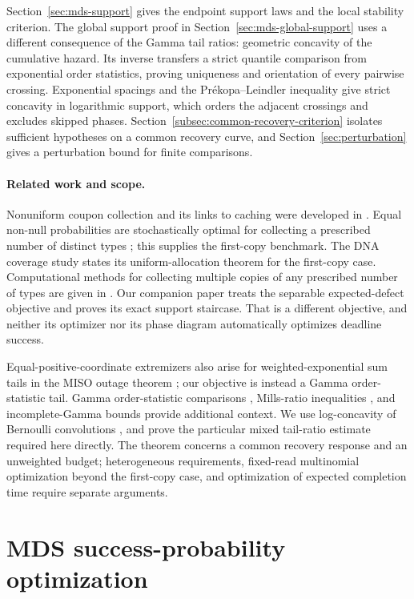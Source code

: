 \documentclass[11pt]{article}
\theoremstyle{definition}
\theoremstyle{remark}
\newcommand{\1}{\mathbf 1}
\begin{document}
Section~\ref{sec:mds-support} gives the endpoint support laws and the
local stability criterion. The global support proof in
Section~\ref{sec:mds-global-support} uses a different consequence of
the Gamma tail ratios: geometric concavity of the cumulative hazard.
Its inverse transfers a strict quantile comparison from exponential
order statistics, proving uniqueness and orientation of every
pairwise crossing. Exponential spacings and the Pr\'ekopa--Leindler
inequality give strict concavity in logarithmic support, which orders
the adjacent crossings and excludes skipped phases.
Section~\ref{subsec:common-recovery-criterion} isolates sufficient
hypotheses on a common recovery curve, and
Section~\ref{sec:perturbation} gives a perturbation bound for finite
comparisons.

\paragraph{Related work and scope.}
Nonuniform coupon collection and its links to caching were developed in \cite{FGT1992}. Equal non-null probabilities are stochastically optimal for collecting a prescribed number of distinct types \cite{Anceaume2015}; this supplies the first-copy benchmark. The DNA coverage study \cite{BarLevSabaryGabrysYaakobi2025} states its uniform-allocation theorem for the first-copy case. Computational methods for collecting multiple copies of any prescribed number of types are given in \cite{Abraham2026}. Our companion paper \cite{LongCloud2026} treats the separable expected-defect objective and proves its exact support staircase. That is a different objective, and neither its optimizer nor its phase diagram automatically optimizes deadline success.

Equal-positive-coordinate extremizers also arise for weighted-exponential sum tails in the MISO outage theorem \cite{Abbe2013}; our objective is instead a Gamma order-statistic tail. Gamma order-statistic comparisons \cite{SunZhang2004}, Mills-ratio inequalities \cite{Baricz2012}, and incomplete-Gamma bounds \cite{Segura2014} provide additional context. We use log-concavity of Bernoulli convolutions \cite{Liggett1997}, and prove the particular mixed tail-ratio estimate required here directly. The theorem concerns a common recovery response and an unweighted budget; heterogeneous requirements, fixed-read multinomial optimization beyond the first-copy case, and optimization of expected completion time require separate arguments.
\section{MDS success-probability optimization}
\label{sec:mds-success-modules}
\end{document}
